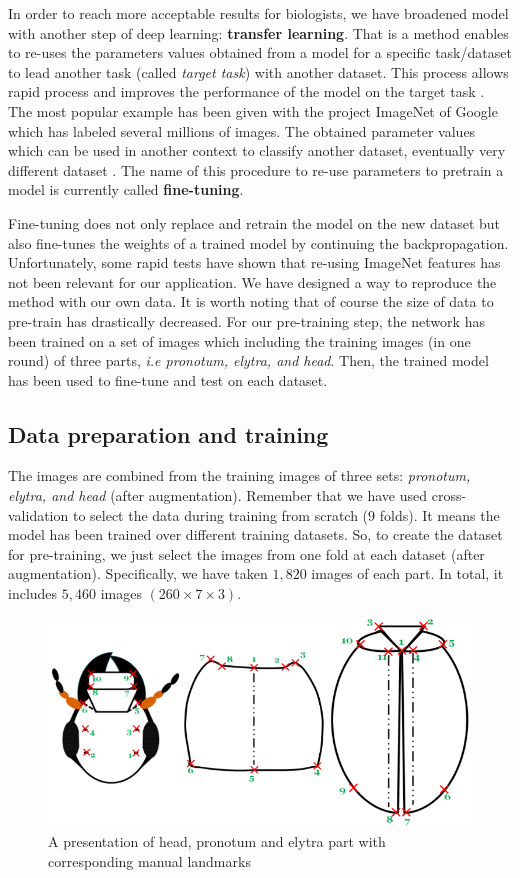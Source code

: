 \documentclass[review]{elsarticle}
\begin{document}
In order to reach more acceptable results for biologists, we have broadened model with another step of deep learning: \textbf{transfer learning}. That is a method enables to re-uses the parameters values obtained from a model  for a specific task/dataset to lead another task (called \textit{target task}) with another dataset. This process allows rapid process and improves the performance of the model on the target task \cite{torrey2009transfer}. The most popular example has been given with the project ImageNet of Google \cite{imagenet_cvpr09} which has labeled several millions of images. The obtained parameter values which can be used in another context to classify another dataset, eventually very different dataset \cite{margeta_mri}. The name of this procedure to re-use parameters to pretrain a model is currently called \textbf{fine-tuning}.

Fine-tuning does not only replace and retrain the model on
the new dataset but also fine-tunes the weights of a trained
model by continuing the backpropagation. Unfortunately,
some rapid tests have shown that re-using ImageNet features
has not been relevant for our application. We have designed a
way to reproduce the method with our own data. It is worth
noting that of course the size of data to pre-train has drastically decreased. For our pre-training step, the network has been
trained on a set of images which including the training images (in one round) of three parts, \textit{i.e pronotum, elytra, and head}. Then, the trained model
has been used to fine-tune and test on each dataset.
\subsection{Data preparation and training}
The images are combined from the training images of three sets: \textit{pronotum, elytra, and head} (after augmentation). Remember that we have used cross-validation to select the data during training from scratch ($9$ folds). It means the model has been trained over different training datasets. So, to create the dataset for pre-training, we just select the images from one fold at each dataset (after augmentation). Specifically, we have taken $1, 820$ images of each part. In total, it includes $5, 460$ images $(260 \times 7 \times 3)$. 

\begin{figure}[htbp]
	\centerline{\includegraphics[scale=0.5]{images/merge}}
	\caption{A presentation of head, pronotum and elytra part with
corresponding manual landmarks}
	\label{figmerge}
\end{figure}
\end{document}
